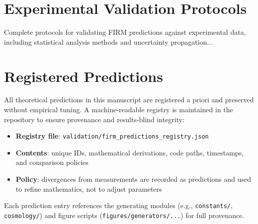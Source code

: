 \documentclass[12pt]{article}
\begin{document}
\section{Experimental Validation Protocols}
\label{app:experimental-protocols}

Complete protocols for validating FIRM predictions against experimental data, including statistical analysis methods and uncertainty propagation...

\section{Registered Predictions}
\label{app:registered-predictions}

All theoretical predictions in this manuscript are registered a priori and preserved without empirical tuning. A machine-readable registry is maintained in the repository to ensure provenance and results-blind integrity:

\begin{itemize}
    \item \textbf{Registry file}: \texttt{validation/firm\_predictions\_registry.json}
    \item \textbf{Contents}: unique IDs, mathematical derivations, code paths, timestamps, and comparison policies
    \item \textbf{Policy}: divergences from measurements are recorded as predictions and used to refine mathematics, not to adjust parameters
\end{itemize}

Each prediction entry references the generating modules (e.g., \texttt{constants/}, \texttt{cosmology/}) and figure scripts (\texttt{figures/generators/...}) for full provenance.


\end{document}

